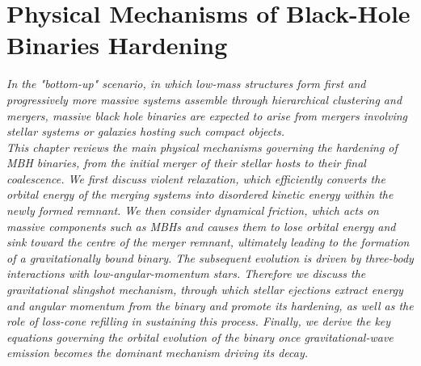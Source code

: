 \documentclass[12pt,twoside,openany]{book}
\begin{document}
\chapter{Physical Mechanisms of Black-Hole Binaries Hardening}\label{chap:chapter1}




\vspace*{\fill}

\begin{center}
\begin{minipage}{0.65\textwidth}
\centering
\textit{In the "bottom-up" scenario, in which low-mass structures form first and progressively more massive systems assemble through hierarchical clustering and mergers, massive black hole binaries are expected to arise from mergers involving stellar systems or galaxies hosting such compact objects.\\This chapter reviews the main physical mechanisms governing the hardening of MBH binaries, from the initial merger of their stellar hosts to their final coalescence. We first discuss violent relaxation, which efficiently converts the orbital energy of the merging systems into disordered kinetic energy within the newly formed remnant. We then consider dynamical friction, which acts on massive components such as MBHs and causes them to lose orbital energy and sink toward the centre of the merger remnant, ultimately leading to the formation of a gravitationally bound binary. The subsequent evolution is driven by three-body interactions with low-angular-momentum stars. Therefore we discuss the gravitational slingshot mechanism, through which stellar ejections extract energy and angular momentum from the binary and promote its hardening, as well as the role of loss-cone refilling in sustaining this process. Finally, we derive the key equations governing the orbital evolution of the binary once gravitational-wave emission becomes the dominant mechanism driving its decay.
}
\end{minipage}
\end{center}

\vspace*{\fill}







\newpage
\end{document}
